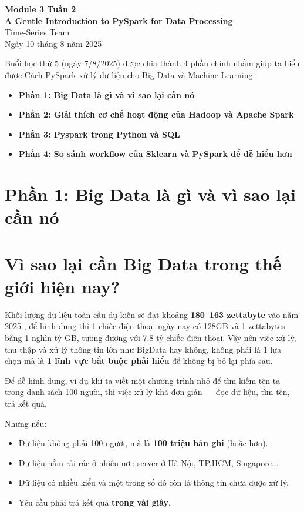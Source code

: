 \documentclass[11pt]{article}
\renewcommand{\maketitle}{%
    \begin{center}
        \fontsize{18}{20}\selectfont\textbf{Module 3 Tuần 2  \\[0.2em] A Gentle Introduction to PySpark for Data Processing}\\[1em]
        \fontsize{14}{16}\selectfont Time-Series Team\\[0.5em]
        \fontsize{14}{16}\selectfont Ngày 10 tháng 8 năm 2025
    \end{center}
    \vspace{1.5em} %
}
\begin{document}
\maketitle %

\begin{summarybox}
   Buổi học thứ 5 (ngày 7/8/2025) được chia thành 4 phần chính nhằm giúp ta hiểu được Cách PySpark xử lý dữ liệu cho Big Data và Machine Learning:
    \begin{itemize}
        \item \textbf{Phần 1: Big Data là gì và vì sao lại cần nó}
        \item \textbf{Phần 2: Giải thích cơ chế hoạt động của Hadoop và Apache Spark}
        \item \textbf{Phần 3: Pyspark trong Python và SQL}
        \item \textbf{Phần 4:  So sánh workflow của Sklearn và PySpark để dễ hiểu hơn}
    \end{itemize}
\end{summarybox}

\section{Phần 1: Big Data là gì và vì sao lại cần nó}
\section{Vì sao lại cần Big Data trong thế giới hiện nay?}
Khối lượng dữ liệu toàn cầu dự kiến sẽ đạt khoảng \textbf{180--163 zettabyte} vào năm 2025 \cite{idc2023}, để hình dung thì 1 chiếc điện thoại ngày nay có 128GB và 1 zettabytes bằng 1 nghìn tỷ GB, tương đương với 7.8 tỷ chiếc điện thoại. Vậy nên việc xử lý, thu thập và xử lý thông tin lớn như BigData hay không, không phải là 1 lựa chọn mà là \textbf{1 lĩnh vực bắt buộc phải hiểu} để không bị bỏ lại phía sau.

\medskip
\noindent Để dễ hình dung, ví dụ khi ta viết một chương trình nhỏ để tìm kiếm tên ta trong danh sách 100 người, thì việc xử lý khá đơn giản --- đọc dữ liệu, tìm tên, trả kết quả.

Nhưng nếu:
\begin{itemize}
    \item Dữ liệu không phải 100 người, mà là \textbf{100 triệu bản ghi} (hoặc hơn).
    \item Dữ liệu nằm rải rác ở nhiều nơi: server ở Hà Nội, TP.HCM, Singapore...
    \item Dữ liệu có nhiều kiểu và một trong số đó còn là thông tin chưa được xử lý.
    \item Yêu cầu phải trả kết quả \textbf{trong vài giây}.
\end{itemize}
\end{document}
